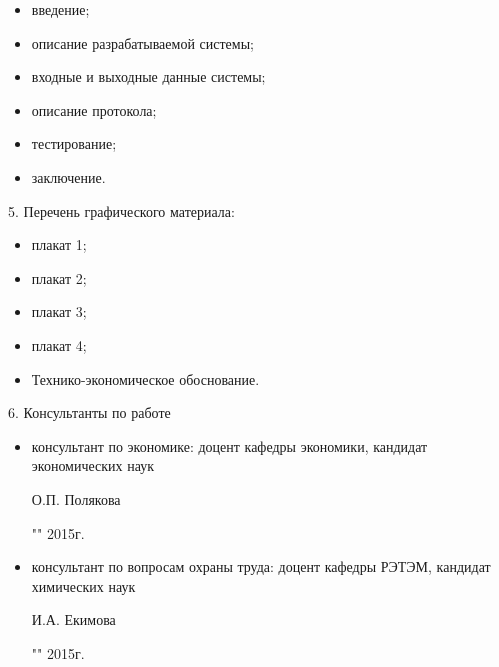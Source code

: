 \begin{itemize}
 \item введение;
 \item описание разрабатываемой системы;
 \item входные и выходные данные системы;
 \item описание протокола;
 \item тестирование;
 \item заключение.
\end{itemize}

5. Перечень графического материала:

\begin{itemize}
 \item плакат 1;
 \item плакат 2;
 \item плакат 3;
 \item плакат 4;
 \item Технико-экономическое обоснование.
\end{itemize}

6. Консультанты по работе

\begin{itemize}
  \item консультант по экономике: доцент кафедры экономики, кандидат \\ экономических наук \\
  \begin{singlespace}
 О.П. Полякова\hfill \underline{\hspace{6cm}} \\
 \begin{flushright} "\underline{\hspace{1cm}}"\underline{\hspace{3cm}} 2015г. \end{flushright}
 \end{singlespace}
 \item консультант по вопросам охраны труда: доцент кафедры РЭТЭМ, кандидат химических наук\\
 \begin{singlespace}
 И.А. Екимова \hfill \underline{\hspace{6cm}} \\
 \begin{flushright} "\underline{\hspace{1cm}}"\underline{\hspace{3cm}} 2015г. \end{flushright}
 \end{singlespace}
\end{itemize}

